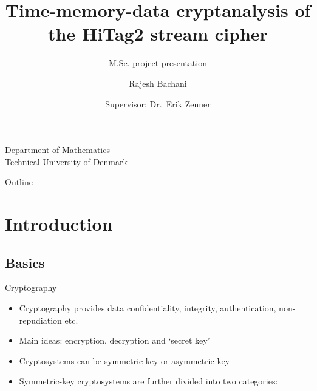 \documentclass{beamer}
\begin{document}
\title{Time-memory-data cryptanalysis of the HiTag2 stream cipher}
\subtitle{M.Sc. project presentation}

\author{Rajesh Bachani}

\institute
{
  Department of Mathematics\\
  Technical University of Denmark
}

\date
{
	Supervisor: Dr.~Erik Zenner
}

\begin{frame}
  \titlepage
\end{frame}

\begin{frame}{Outline}
  \footnotesize{\tableofcontents}
\end{frame}

\section{Introduction}

\subsection{Basics}

\begin{frame}{Cryptography}
\footnotesize{
  \begin{itemize}
  \item Cryptography provides data confidentiality, integrity, authentication, non-repudiation etc. 
  \item Main ideas: encryption, decryption and `secret key'
  \item Cryptosystems can be symmetric-key or asymmetric-key
  \item Symmetric-key cryptosystems are further divided into two categories: 
  \end{itemize}}
\end{frame}
\end{document}
